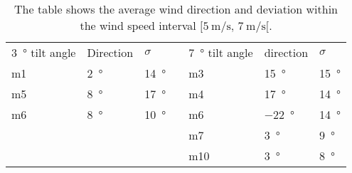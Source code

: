 \begin{table}[H]
\centering
\caption{The table shows the average wind direction and deviation within the wind speed interval $[\SI{5}{\meter\per\second},\, \SI{7}{\meter\per\second}[ $.}
\begin{tabular}{lllll|l|l}
\multicolumn{1}{l|}{\SI{3}{\degree} tilt angle} & \multicolumn{1}{l|}{Direction} & $\sigma$ &  &  \SI{7}{\degree} tilt angle & direction & $\sigma$  \\ \cline{1-3} \cline{5-7} 
\multicolumn{1}{l|}{m1} & \multicolumn{1}{l|}{\SI{2}{\degree} }& \SI{14}{\degree} &  & m3    & \SI{15}{\degree}        & \SI{15}{\degree}  \\
\multicolumn{1}{l|}{m5} & \multicolumn{1}{l|}{ \SI{8}{\degree}} & \SI{17}{\degree} &  & m4    & \SI{17}{\degree}        & \SI{14}{\degree}  \\
\multicolumn{1}{l|}{m6} & \multicolumn{1}{l|}{ \SI{8}{\degree} } & \SI{10}{\degree} &  &m6    & \SI{-22}{\degree}       & \SI{14}{\degree}  \\
                                     &                                                          &                            &   & m7    &  \SI{3}{\degree}         & \SI{9}{\degree}  \\
                                     &                                                          &                           &   & m10   & \SI{3}{\degree}         & \SI{8}{\degree}  
\end{tabular}
\label{ta:meas:approved_data_par_wind}
\end{table}